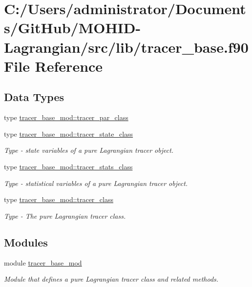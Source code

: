 \hypertarget{tracer__base_8f90}{}\section{C\+:/\+Users/administrator/\+Documents/\+Git\+Hub/\+M\+O\+H\+I\+D-\/\+Lagrangian/src/lib/tracer\+\_\+base.f90 File Reference}
\label{tracer__base_8f90}
\subsection*{Data Types}
\begin{DoxyCompactItemize}
\item 
type \hyperlink{structtracer__base__mod_1_1tracer__par__class}{tracer\+\_\+base\+\_\+mod\+::tracer\+\_\+par\+\_\+class}
\item 
type \hyperlink{structtracer__base__mod_1_1tracer__state__class}{tracer\+\_\+base\+\_\+mod\+::tracer\+\_\+state\+\_\+class}
\begin{DoxyCompactList}\small\item\em Type -\/ state variables of a pure Lagrangian tracer object. \end{DoxyCompactList}\item 
type \hyperlink{structtracer__base__mod_1_1tracer__stats__class}{tracer\+\_\+base\+\_\+mod\+::tracer\+\_\+stats\+\_\+class}
\begin{DoxyCompactList}\small\item\em Type -\/ statistical variables of a pure Lagrangian tracer object. \end{DoxyCompactList}\item 
type \hyperlink{structtracer__base__mod_1_1tracer__class}{tracer\+\_\+base\+\_\+mod\+::tracer\+\_\+class}
\begin{DoxyCompactList}\small\item\em Type -\/ The pure Lagrangian tracer class. \end{DoxyCompactList}\end{DoxyCompactItemize}
\subsection*{Modules}
\begin{DoxyCompactItemize}
\item 
module \hyperlink{namespacetracer__base__mod}{tracer\+\_\+base\+\_\+mod}
\begin{DoxyCompactList}\small\item\em Module that defines a pure Lagrangian tracer class and related methods. \end{DoxyCompactList}\end{DoxyCompactItemize}
